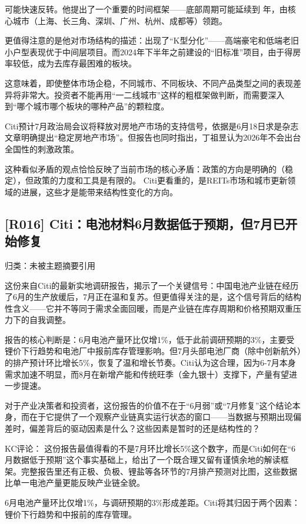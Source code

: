 \documentclass[11pt]{ctexart}
\begin{document}
可能快速反转。他提出了一个重要的时间框架——底部周期可能延续到 年，由核心城市（上海、长三角、深圳、广州、杭州、成都等）领跑。

更值得注意的是他对市场结构的描述：出现了“K型分化”——高端豪宅和低端老旧小户型表现优于中间层项目。而2024年下半年之前建设的“旧标准”项目，由于得房率较低，成为去库存最困难的板块。

这意味着，即使整体市场企稳，不同城市、不同板块、不同产品类型之间的表现差异将非常大。投资者不能再用“一二线城市”这样的粗框架做判断，而需要深入到“哪个城市哪个板块的哪种产品”的颗粒度。

Citi预计7月政治局会议将释放对房地产市场的支持信号，依据是6月18日求是杂志文章明确提出“稳定房地产市场”。但报告也同时指出，丁祖昱认为2026年不会出台全国性的刺激政策。

这种看似矛盾的观点恰恰反映了当前市场的核心矛盾：政策的方向是明确的（稳定），但政策的力度和工具是有限的。 Citi更看重的，是REITs市场和城市更新领域的进展，这些才是能带来结构性变化的方向。

\subsection{[R016] Citi：电池材料6月数据低于预期，但7月已开始修复}
{\small\color{refgray}归类：未被主题摘要引用}

这份来自Citi的最新实地调研报告，揭示了一个关键信号：中国电池产业链在经历了6月的生产放缓后，7月正在温和复苏。但更值得关注的是，这个信号背后的结构性含义——它并不等同于需求全面回暖，而是产业链在库存周期和价格预期双重压力下的自我调整。

报告的核心判断是：6月电池产量环比仅增1\%，低于此前调研预期的3\%，主要受锂价下行趋势和电池厂中报前库存管理影响。但7月头部电池厂商（除中创新航外）的排产预计环比增长5\%，恢复了温和增长节奏。Citi认为这合理，因为6-7月本身需求加速不明显，而8月在新增产能和传统旺季（金九银十）支撑下，产量有望进一步提速。

对于产业决策者和投资者，这份报告的价值不在于“6月弱”或“7月修复”这个结论本身，而在于它提供了一个观察产业链真实运行状态的窗口——当数据与预期出现偏差时，偏差背后的驱动因素是什么？这些因素是暂时的还是结构性的？

KC评论： 这份报告最值得看的不是7月环比增长5\%这个数字，而是Citi如何在“6月数据低于预期”这个事实基础上，给出了一个既合理又留有谨慎余地的解读框架。完整报告里还有正极、负极、锂盐等各环节的7月排产预测对比图，这些数据比单一电池产量更能反映产业链全貌。

6月电池产量环比仅增1\%，与调研预期的3\%形成差距。Citi将其归因于两个因素：锂价下行趋势和中报前的库存管理。
\end{document}

